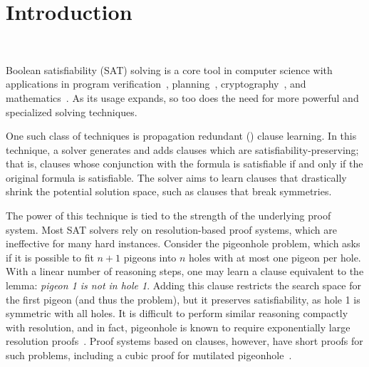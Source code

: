 \section{Introduction}~\label{sec:intro}


Boolean satisfiability (SAT) solving is a core tool in computer science with
applications in program
verification~\cite{BillionQueries,sat-hardwareverification,ic3,bmc},
planning~\cite{planning,planningassat}, cryptography~\cite{cryptominisat}, and
mathematics~\cite{chromaticnumber,pythagoreantriples,kellersconjecture,emptyhexagon}.
As its usage expands, so too does the need for more powerful and specialized
solving techniques.



One such class of techniques is propagation redundant (\pr) clause learning. In
this technique, a solver generates and adds clauses which are
satisfiability-preserving; that is, clauses whose conjunction with the formula
is satisfiable if and only if the original formula is satisfiable. The solver
aims to learn clauses that drastically shrink the potential solution space, such
as clauses that break symmetries.




The power of this technique is tied to the strength of the underlying proof
system. Most SAT solvers rely on resolution-based proof systems, which are
ineffective for many hard instances. Consider the pigeonhole problem, which asks
if it is possible to fit $n+1$ pigeons into $n$ holes with at most one pigeon
per hole. With a linear number of \pr reasoning steps, one may learn a \pr clause
equivalent to the lemma: \emph{pigeon 1 is not in hole 1}. Adding this clause
restricts the search space for the first pigeon (and thus the problem), but it
preserves satisfiability, as hole 1 is symmetric with all holes. It is difficult
to perform similar reasoning compactly with resolution, and in fact, pigeonhole
is known to require exponentially
large resolution proofs~\cite{hakenpigeonhole,mutilatedchessboard-exponential}.
Proof systems based on \pr clauses, however, have short proofs for such
problems, including a cubic proof for mutilated
pigeonhole~\cite{prclauses}.

